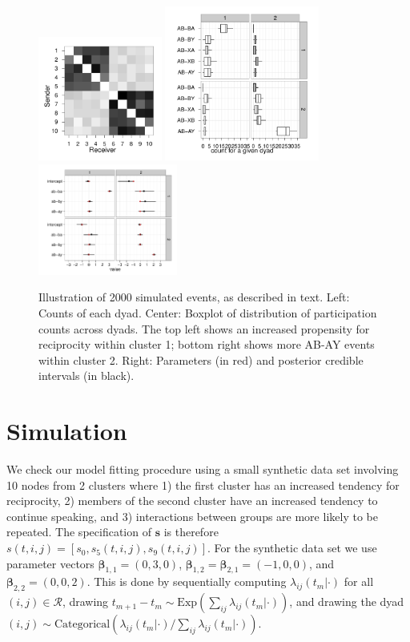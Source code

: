 \documentclass{article}
\begin{document}
\begin{figure}
\center
\includegraphics[width=1.6in]{../figs/synthetic/mat.pdf}
\includegraphics[width=2in]{../figs/synthetic/counts.pdf}
\includegraphics[width=1.8in]{../figs/synthetic/params-estimates.pdf}
\caption{Illustration of 2000 simulated events, as described in text. Left: Counts of each dyad. Center: Boxplot of distribution of participation counts across dyads.  The top left shows an increased propensity for reciprocity within cluster 1; bottom right shows more AB-AY events within cluster 2.  Right: Parameters (in red) and posterior credible intervals (in black).}
\label{fig:syncounts}
\end{figure}

\section{Simulation}

We check our model fitting procedure using a small synthetic data set involving 10 nodes from 2 clusters where 1) the first cluster has an increased tendency for reciprocity, 2) members of the second cluster have an increased tendency to continue speaking, and 3) interactions between groups are more likely to be repeated.  The specification of $\textbf{s}$ is therefore $s(t,i,j) = [s_0, s_{5}(t,i,j), s_{9}(t,i,j)]$.  For the synthetic data set we use parameter vectors $\boldsymbol{\beta}_{1,1} = (0,3,0)$,  $\boldsymbol{\beta}_{1,2} = \boldsymbol{\beta}_{2,1} = (-1,0,0)$, and $\boldsymbol{\beta}_{2,2} = (0,0,2)$.  This is done by sequentially computing $\lambda_{ij}(t_m|\cdot)$ for all $(i,j) \in \mathcal{R}$, drawing $t_{m+1}-t_m \sim \mbox{Exp}(\sum_{ij} \lambda_{ij}(t_m|\cdot))$, and drawing the dyad $(i,j) \sim \mbox{Categorical}(\lambda_{ij}(t_m|\cdot) / \sum_{ij}\lambda_{ij}(t_m|\cdot))$.  
\end{document}
